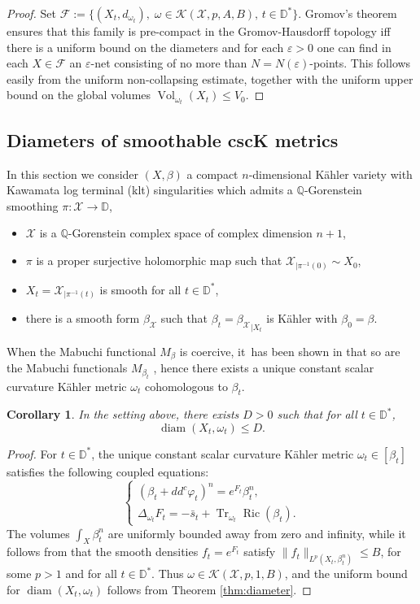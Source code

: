 \documentclass[JEP,XML,SOM,Unicode,published]{cedram}
\DeclareMathOperator{\diam}{diam}
\DeclareMathOperator{\Ric}{Ric}
\DeclareMathOperator{\Tr}{Tr}
\DeclareMathOperator{\Vol}{Vol}
\newtheorem{coro}[theorem]{Corollary}
\theoremstyle{definition}
\newcommand{\D}{\mathbb D}
\newcommand{\Q}{\mathbb Q}
\let\e\varepsilon
\begin{document}
\begin{proof}
Set ${\mathcal F}:=\{ (X_t,d_{\omega_t}), \; \omega \in {\mathcal K}(\mathcal{X},p,A,B), \, t \in \D^* \}$.
Gromov's theorem \cite[Th.\,7.4.15]{BBI01} ensures that this family is pre-compact in the Gromov-Hausdorff
topology iff there is a uniform bound on the diameters and for each $\e>0$
one can find in each $X \in {\mathcal F}$ an $\e$-net consisting of no more than
$N=N(\e)$-points. This follows easily from the uniform non-collapsing estimate, together
with the uniform upper bound on the global volumes $\Vol_{\omega_t}(X_t) \leq V_0$.
\end{proof}

\subsection{Diameters of smoothable cscK metrics} \label{sec:csck}

In this section we consider $(X,\beta)$ a compact $n$-dimensional Kähler variety with Kawamata log terminal (klt) singularities
which admits a $\Q$-Gorenstein smoothing
$\pi: {\mathcal X} \rightarrow \D$, \ie
\begin{itemize}
\item ${\mathcal X}$ is a $\Q$-Gorenstein complex space of complex dimension $n+1$,
\item $\pi$ is a proper surjective holomorphic map such that ${\mathcal X}_{|\pi^{-1}(0)} \sim X_0$,
\item $X_t={\mathcal X}_{|\pi^{-1}(t)}$ is smooth for all $t \in \D^*$,
\item there is a smooth form $\beta_{{\mathcal X}}$ such that
$\beta_t={\beta_{{\mathcal X}}}_{|X_t}$ is Kähler with $\beta_0=\beta$.
\end{itemize}

When the Mabuchi functional $M_{\beta}$ is coercive, it~has been shown in \cite[Th.\,C]{PTT23} that
so are the Mabuchi functionals $M_{\beta_t}$ , hence
there exists a unique constant scalar curvature Kähler metric $\omega_t$ cohomologous to $\beta_t$.

\begin{coro} \label{cor:csck}
In the setting above, there exists $D>0$ such that for all $t \in \D^*$,
\[
\diam(X_t,\omega_t) \leq D.
\]
\end{coro}

\begin{proof}
For $t\in \mathbb{D}^* $, the unique constant scalar curvature Kähler metric $\omega_t\in [\beta_t]$
satisfies the following coupled equations:
\[
\begin{cases}
(\beta_t+ dd^c \varphi_t)^n = e^{F_t} \beta_t^n, \\
\Delta_{\omega_t} F_t= -\bar s_t + \Tr_{\omega_t} \Ric(\beta_t).
\end{cases}
\]
The volumes $\int_X \beta_t^n$ are uniformly bounded away from zero and infinity, while
it follows from \cite[Th.\,5.3]{PTT23} that
the smooth densities $f_t\!=\!e^{F_t}$
satisfy \hbox{$\|f_t\|_{L^p(X_t, \beta_t^n)} \!\leq\! B$}, for some $p>1$ and for all $t\in \mathbb{D}^*$.
Thus $\omega\in {\mathcal K}(\mathcal{X},p,1,B)$, and the uniform bound for $\diam(X_t, \omega_t) $ follows from Theorem \ref{thm:diameter}.
\end{proof}
\end{document}
